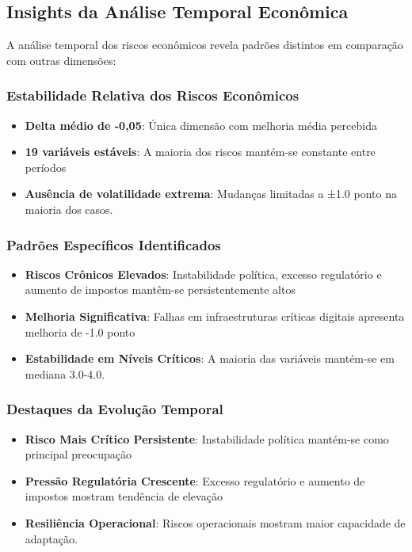 \documentclass[
  portuguese,
  letterpaper,
  DIV=11,
  numbers=noendperiod]{scrreprt}
\providecommand{\tightlist}{%
  \setlength{\itemsep}{0pt}\setlength{\parskip}{0pt}}
\begin{document}
\subsection{Insights da Análise Temporal
Econômica}\label{insights-da-anuxe1lise-temporal-econuxf4mica}

A análise temporal dos riscos econômicos revela padrões distintos em
comparação com outras dimensões:

\subsubsection{Estabilidade Relativa dos Riscos
Econômicos}\label{estabilidade-relativa-dos-riscos-econuxf4micos}

\begin{itemize}
\tightlist
\item
  \textbf{Delta médio de -0,05}: Única dimensão com melhoria média
  percebida
\item
  \textbf{19 variáveis estáveis}: A maioria dos riscos mantém-se
  constante entre períodos
\item
  \textbf{Ausência de volatilidade extrema}: Mudanças limitadas a ±1.0
  ponto na maioria dos casos.
\end{itemize}

\subsubsection{Padrões Específicos
Identificados}\label{padruxf5es-especuxedficos-identificados-1}

\begin{itemize}
\tightlist
\item
  \textbf{Riscos Crônicos Elevados}: Instabilidade política, excesso
  regulatório e aumento de impostos mantêm-se persistentemente altos
\item
  \textbf{Melhoria Significativa}: Falhas em infraestruturas críticas
  digitais apresenta melhoria de -1.0 ponto
\item
  \textbf{Estabilidade em Níveis Críticos}: A maioria das variáveis
  mantém-se em mediana 3.0-4.0.
\end{itemize}

\subsubsection{Destaques da Evolução
Temporal}\label{destaques-da-evoluuxe7uxe3o-temporal}

\begin{itemize}
\tightlist
\item
  \textbf{Risco Mais Crítico Persistente}: Instabilidade política
  mantém-se como principal preocupação
\item
  \textbf{Pressão Regulatória Crescente}: Excesso regulatório e aumento
  de impostos mostram tendência de elevação
\item
  \textbf{Resiliência Operacional}: Riscos operacionais mostram maior
  capacidade de adaptação.
\end{itemize}
\end{document}
